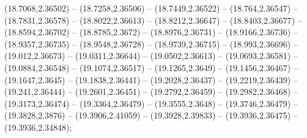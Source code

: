 {(18.7068,2.36502) -- (18.7258,2.36506) -- (18.7449,2.36522) -- (18.764,2.36547) -- (18.7831,2.36578) -- (18.8022,2.36613) -- (18.8212,2.36647) -- (18.8403,2.36677) -- (18.8594,2.36702) -- (18.8785,2.3672) -- (18.8976,2.36731) -- (18.9166,2.36736) -- (18.9357,2.36735) -- (18.9548,2.36728) -- (18.9739,2.36715) -- (18.993,2.36696) -- (19.012,2.36673) -- (19.0311,2.36644) -- (19.0502,2.36613) -- (19.0693,2.36581) -- (19.0884,2.36548) -- (19.1074,2.36517) -- (19.1265,2.3649) -- (19.1456,2.36467) -- (19.1647,2.3645) -- (19.1838,2.36441) -- (19.2028,2.36437) -- (19.2219,2.36439) -- (19.241,2.36444) -- (19.2601,2.36451) -- (19.2792,2.36459) -- (19.2982,2.36468) -- (19.3173,2.36474) -- (19.3364,2.36479) -- (19.3555,2.3648) -- (19.3746,2.36479) -- (19.3828,2.3876) -- (19.3906,2.41059) -- (19.3928,2.39833) -- (19.3936,2.36475) -- (19.3936,2.34848);

}{

}
